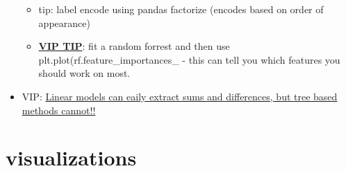 \documentclass[a4paper]{report}
\begin{document}
\begin{itemize}
\begin{itemize}
      \item tip: label encode using pandas factorize (encodes based on order of appearance)
      \item \underline{\bf VIP TIP}: fit a random forrest and then use {\color{brown} plt.plot(rf.feature\_importances\_} - this can tell you which features you should work on most.
    \end{itemize}
  \item VIP: \underline{Linear models can eaily extract sums and differences, but tree based methods cannot!!}
\end{itemize}	

\section{visualizations}
\end{document}

